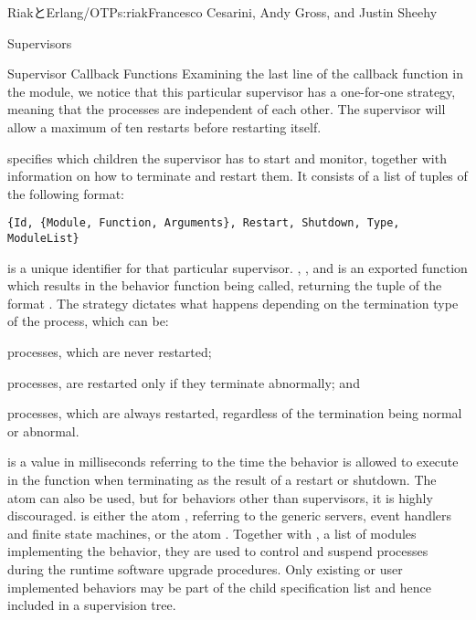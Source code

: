 \begin{aosachapter}{RiakとErlang/OTP}{s:riak}{Francesco Cesarini, Andy Gross, and Justin Sheehy}
\begin{aosasect1}{Supervisors}
\begin{aosasect2}{Supervisor Callback Functions}
Examining the last line of the  callback function in the
 module, we notice that this particular
supervisor has a one-for-one strategy, meaning that the processes are
independent of each other. The supervisor will allow a maximum of ten
restarts before restarting itself.

 specifies which children the supervisor
has to start and monitor, together with information on how to
terminate and restart them. It consists of a list of tuples of the
following format:

\begin{verbatim}
{Id, {Module, Function, Arguments}, Restart, Shutdown, Type, ModuleList}
\end{verbatim}

 is a unique identifier for that particular
supervisor. , , and  is an
exported function which results in the behavior 
function being called, returning the tuple of the format . The  strategy dictates what happens
depending on the termination type of the process, which can be:

\begin{aosaitemize}

\item {} processes, which are never restarted;

  \item {} processes, are restarted only if they terminate
  abnormally; and

  \item {} processes, which are always restarted, regardless of
  the termination being normal or abnormal.

\end{aosaitemize}

 is a value in milliseconds referring to the time the
behavior is allowed to execute in the  function when
terminating as the result of a restart or shutdown. The atom
 can also be used, but for behaviors other than
supervisors, it is highly discouraged.  is either the atom
, referring to the generic servers, event handlers and
finite state machines, or the atom . Together with
, a list of modules implementing the behavior, they
are used to control and suspend processes during the runtime software
upgrade procedures. Only existing or user implemented behaviors may be
part of the child specification list and hence included in a
supervision tree.


\end{aosasect2}
\end{aosasect1}
\end{aosachapter}
